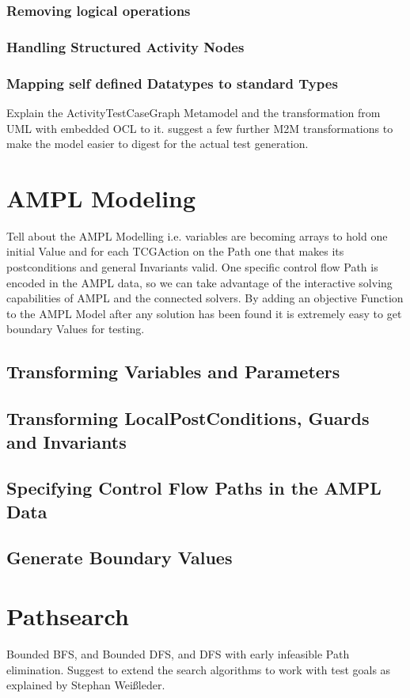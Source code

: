 \subsubsection{Removing logical operations}
\subsubsection{Handling Structured Activity Nodes}
\subsubsection{Mapping self defined Datatypes to standard Types}
Explain the ActivityTestCaseGraph Metamodel and the transformation from UML with embedded OCL to it. 
suggest a few further M2M transformations to make the model easier to digest for the actual test generation.
\section{AMPL Modeling}
Tell about the AMPL Modelling i.e. variables are becoming arrays to hold one initial Value and for each TCGAction on the Path one that makes its postconditions and general Invariants valid. One specific control flow Path is encoded in the AMPL data, so we can take advantage of the interactive solving capabilities of AMPL and the connected solvers.
By adding an objective Function to the AMPL Model after any solution has been found it is extremely easy to get boundary Values for testing.
\subsection{Transforming Variables and Parameters}
\subsection{Transforming LocalPostConditions, Guards and Invariants}
\subsection{Specifying Control Flow Paths in the AMPL Data}
\subsection{Generate Boundary Values}
\section{Pathsearch}
Bounded BFS, and Bounded DFS, and DFS with early infeasible Path elimination.
Suggest to extend the search algorithms to work with test goals as explained by Stephan Weißleder.
